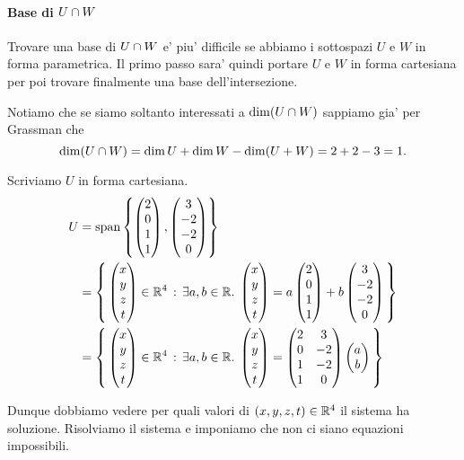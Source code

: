 \begin{example}
    \paragraph{Base di $U \cap W$}
    Trovare una base di $U \cap W$ e' piu' difficile se abbiamo i sottospazi $U$ e $W$ in forma parametrica. Il primo passo sara' quindi portare $U$ e $W$ in forma cartesiana per poi trovare finalmente una base dell'intersezione.

    Notiamo che se siamo soltanto interessati a $\dim(U \cap W)$ sappiamo gia' per Grassman che \[
        \dim(U \cap W) = \dim U + \dim W - \dim(U + W) = 2 + 2 - 3 = 1.    
    \]

    Scriviamo $U$ in forma cartesiana.
    \begin{align*}
        U &= \operatorname{span}\left\{\begin{pmatrix} 2\\0\\1\\1 \end{pmatrix}, \begin{pmatrix} 3\\-2\\-2\\0 \end{pmatrix}\right\}\\
        &= \left\{\, \begin{pmatrix} x\\y\\z\\t \end{pmatrix} \in \mathbb{R}^4 \,:\, \exists a, b \in \mathbb{R}. \; \begin{pmatrix} x\\y\\z\\t \end{pmatrix} = a\begin{pmatrix} 2\\0\\1\\1 \end{pmatrix} + b\begin{pmatrix} 3\\-2\\-2\\0 \end{pmatrix}\,\right\}\\
        &= \left\{\, \begin{pmatrix} x\\y\\z\\t \end{pmatrix} \in \mathbb{R}^4 \,:\, \exists a, b \in \mathbb{R}. \; \begin{pmatrix} x\\y\\z\\t \end{pmatrix} = \begin{pmatrix} 2&3\\0&-2\\1&-2\\1&0 \end{pmatrix}\begin{pmatrix} a\\b \end{pmatrix}\,\right\}
    \end{align*}

    Dunque dobbiamo vedere per quali valori di $(x, y, z, t) \in \mathbb{R}^4$ il sistema ha soluzione. Risolviamo il sistema e imponiamo che non ci siano equazioni impossibili.


\end{example}
